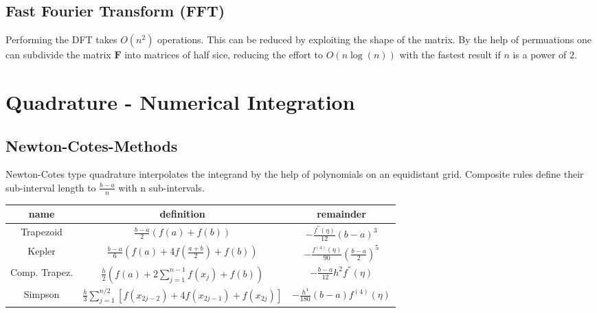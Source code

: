 \documentclass[
    a4paper,
    11pt
]{article}
\begin{document}
\subsection{Fast Fourier Transform (FFT)}

Performing the DFT takes $O(n^2)$ operations. This can be reduced by exploiting
the shape of the matrix. By the help of permuations one can subdivide the matrix
$\mathbf{F}$ into matrices of half sice, reducing the effort to $O(n\log(n))$
with the fastest result if $n$ is a power of $2$.


\section{Quadrature - Numerical Integration}

\subsection{Newton-Cotes-Methods}

Newton-Cotes type quadrature interpolates the integrand by the help of
polynomials on an equidistant grid. Composite rules define their sub-interval
length to $\frac{b-a}{n}$ with n sub-intervals.


\begin{table}[H]
    \centering
    \begin{tabulary}{\linewidth}{C C C}
        \toprule
        name & definition & remainder\\
        \midrule
        Trapezoid &
            $\displaystyle \frac{b-a}{2} (f(a) + f(b)) $ &
            $\displaystyle -\frac{f^{''}(\eta)}{12}(b-a)^3$
        \\
        Kepler &
            $\displaystyle \frac{b-a}{6} \left( f(a) + 4f(\frac{a+b}{2}) + f(b)
            \right)$ &
            $\displaystyle - \frac{f^{(4)}(\eta)}{90} \left(\frac{b-a}{2}
            \right)^5$
        \\
        \midrule
        Comp. Trapez. &
            $\displaystyle \frac{h}{2} \left( f(a) + 2 \sum_{j=1}^{n-1}f(x_j) +
            f(b) \right) $ &
            $\displaystyle - \frac{b-a}{12} h^2 f^{''}(\eta)$
        \\
        Simpson &
            $\displaystyle \frac{h}{3} \sum_{j=1}^{n/2} \left[ f(x_{2j-2}) + 4
            f(x_{2j-1}) + f(x_{2j}) \right] $ &
            $\displaystyle - \frac{h^4}{180}(b-a) f^{(4)}(\eta)$
        \\

        \bottomrule

    \end{tabulary}
\end{table}
\end{document}
